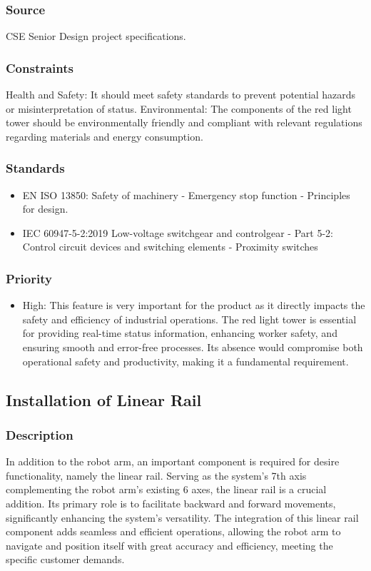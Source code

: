 \subsubsection{Source}
CSE Senior Design project specifications.
\subsubsection{Constraints}
Health and Safety: It should meet safety standards to prevent potential hazards or misinterpretation of status.
Environmental: The components of the red light tower should be environmentally friendly and compliant with relevant regulations regarding materials and energy consumption.
\subsubsection{Standards}
\begin{itemize}
\item EN ISO 13850: Safety of machinery - Emergency stop function - Principles for design.
\item IEC 60947-5-2:2019 Low-voltage switchgear and controlgear - Part 5-2: Control circuit devices and switching elements - Proximity switches
\end{itemize}
\subsubsection{Priority}
\begin{itemize}
\item High:
This feature is very important for the product as it directly impacts the safety and efficiency of industrial operations. The red light tower is essential for providing real-time status information, enhancing worker safety, and ensuring smooth and error-free processes. Its absence would compromise both operational safety and productivity, making it a fundamental requirement.
\end{itemize}

\subsection{Installation of Linear Rail}
\subsubsection{Description}
In addition to the robot arm, an important component is required for desire functionality, namely the linear rail. Serving as the system's 7th axis complementing the robot arm's existing 6 axes, the linear rail is a crucial addition. Its primary role is to facilitate backward and forward movements, significantly enhancing the system's versatility. The integration of this linear rail component adds seamless and efficient operations, allowing the robot arm to navigate and position itself with great accuracy and efficiency, meeting the specific customer demands.
